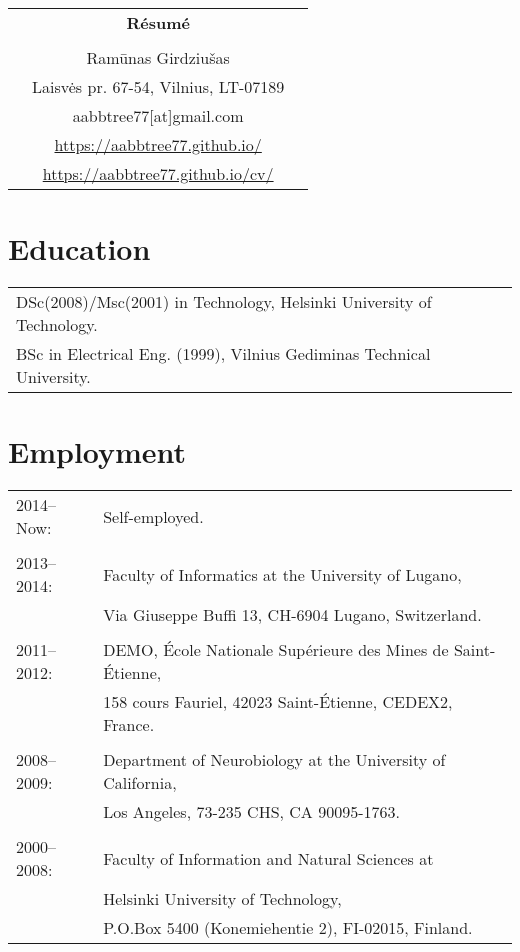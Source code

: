 \documentclass[a4paper,11pt]{article}
\begin{document}
\thispagestyle{empty}

%
%
\begin{center}
\begin{tabular}{ccc}
&\Large \textbf{R\'{e}sum\'{e}}&\\
\\
& Ram\={u}nas Girdziu\v{s}as &\\  
& Laisvės pr. 67-54, Vilnius, LT-07189 &\\
& aabbtree77[at]gmail.com &\\
& \url{https://aabbtree77.github.io/} &\\
& \url{https://aabbtree77.github.io/cv/}
\end{tabular}
\end{center}
%
\section*{Education}
%
\begin{tabular}{ll}
        DSc(2008)/Msc(2001) in Technology, Helsinki University of Technology. \\
        BSc in Electrical Eng. (1999), Vilnius Gediminas Technical University. 
\end{tabular}
%
\section*{Employment}
%
\begin{tabular}{ll}
2014--Now: & Self-employed.\\
           & \\
2013--2014: & Faculty of Informatics at the University of Lugano,\\
                        & Via Giuseppe Buffi 13, CH-6904 Lugano, Switzerland. \\
&\\
2011--2012: & DEMO, \'{E}cole Nationale Sup\'{e}rieure des Mines de Saint-\'{E}tienne,\\
&158 cours Fauriel, 42023 Saint-\'Etienne, CEDEX2, France. \\
&\\
2008--2009: & Department of Neurobiology at the University of California,\\
&Los Angeles, 73-235 CHS, CA 90095-1763. \\
&\\
2000--2008: & Faculty of Information and Natural Sciences at\\
            & Helsinki University of Technology,\\ 
&  P.O.Box 5400 (Konemiehentie 2), FI-02015, Finland. \\
\end{tabular}
\end{document}
